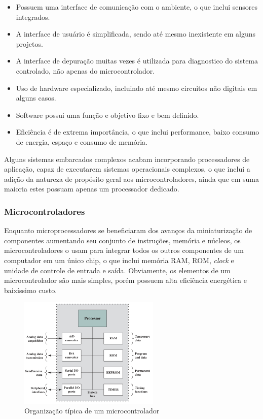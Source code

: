 \documentclass{article}
\begin{document}
\begin{itemize}
    \item Possuem uma interface de comunicação com o ambiente,
        o que inclui sensores integrados.

    \item A interface de usuário é simplificada, sendo até mesmo
        inexistente em alguns projetos.

    \item A interface de depuração muitas vezes é utilizada para
        diagnostico do sistema controlado, não apenas do microcontrolador.

    \item Uso de hardware especializado, incluindo até mesmo circuitos
        não digitais em alguns casos.

    \item Software possui uma função e objetivo fixo e bem definido.

    \item Eficiência é de extrema importância, o que inclui performance,
        baixo consumo de energia, espaço e consumo de memória.
\end{itemize}

Alguns sistemas embarcados complexos acabam incorporando processadores de
aplicação, capaz de executarem sistemas operacionais complexos, o que inclui a
adição da natureza de propósito geral aos microcontroladores, ainda que em suma
maioria estes possuam apenas um processador dedicado.

\subsubsection{Microcontroladores}
Enquanto microprocessadores se beneficiaram dos avanços da miniaturização de
componentes aumentando seu conjunto de instruções, memória e núcleos, os
microcontroladores o usam para integrar todos os outros componentes de um
computador em um único chip, o que inclui memória RAM, ROM, \textit{clock} e
unidade de controle de entrada e saída. Obviamente, os elementos de um
microcontrolador são mais simples, porém possuem alta eficiência energética e
baixíssimo custo.

\begin{figure}[h]
    \centering
    \includegraphics[width=0.6\textwidth]{uc.png}
    \caption{Organização típica de um microcontrolador}
\end{figure}
\end{document}
